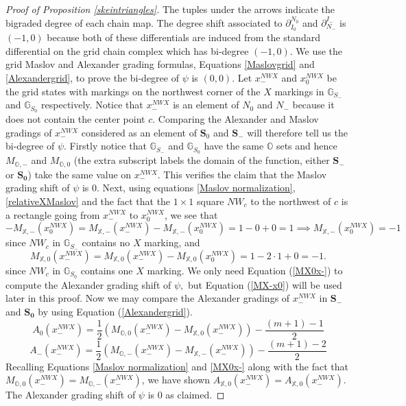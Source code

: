 \documentclass[11pt]{amsart}
\theoremstyle{definition}
\theoremstyle{remark}
\numberwithin{equation}{section}
\begin{document}
\begin{proof}[Proof of Proposition \ref{skeintriangles}]
The tuples under the arrows indicate the bigraded degree of each chain map. The degree shift associated to $\partial_{I_0}^{N_0}$ and $\partial_{N_-}^{I_-}$ is $(-1,0)$ because both of these differentials are induced from the standard differential on the grid chain complex which has bi-degree $(-1,0)$. We use the grid Maslov and Alexander grading formulas, Equations \ref{Maslovgrid} and \ref{Alexandergrid}, to prove the bi-degree of $\psi$ is $(0,0)$.  Let $x_-^{NWX}$ and $x_0^{NWX}$ be the grid states with markings on the northwest corner of the $X$ markings in $\mathbb{G}_{S_-}$ and $\mathbb{G}_{S_0}$ respectively. Notice that $x_-^{NWX}$ is an element of $N_0$ and $N_-$ because it does not contain the center point $c$. Comparing the Alexander and Maslov gradings of $x_-^{NWX}$ considered as an element of $\mathbf{S}_0$ and $\mathbf{S}_-$ will therefore tell us the bi-degree of $\psi$. Firstly notice that $\mathbb{G}_{S_-}$ and $\mathbb{G}_{S_0}$ have the same $\mathbb{O}$ sets and hence $M_{\mathbb{O},-}$ and $M_{\mathbb{O},0}$ (the extra subscript labels the domain of the function, either $\mathbf{S_-}$ or $\mathbf{S_0}$) take the same value on $x_-^{NWX}$. This verifies the claim that the Maslov grading shift of $\psi$ is $0$. Next, using equations \ref{Maslov normalization}, \ref{relativeXMaslov} and the fact that the $1\times1$ square $NW_c$ to the northwest of $c$ is a rectangle going from $x_-^{NWX}$ to $x_0^{NWX}$, we see that 
\begin{equation}\label{MX-x0}
    -M_{\mathbb{X},-}(x_0^{NWX})=M_{\mathbb{X},-}(x_-^{NWX})-M_{\mathbb{X},-}(x_0^{NWX})=1-0+0=1\implies M_{\mathbb{X},-}(x_0^{NWX})=-1
\end{equation}
since $NW_c$ in $\mathbb{G}_{S_-}$ contains no $X$ marking, and 
\begin{equation}\label{MX0x-}
M_{\mathbb{X},0}(x_-^{NWX})=M_{\mathbb{X},0}(x_-^{NWX})-M_{\mathbb{X},0}(x_0^{NWX})=1-2\cdot 1+0=-1. 
\end{equation}
since $NW_c$ in $\mathbb{G}_{S_0}$ contains one $X$ marking.
We only need Equation (\ref{MX0x-}) to compute the Alexander grading shift of $\psi,$ but Equation (\ref{MX-x0}) will be used later in this proof. Now we may compare the Alexander gradings of $x_-^{NWX}$ in $\mathbf{S_-}$ and $\mathbf{S_0}$ by using Equation (\ref{Alexandergrid}).
\begin{equation}\label{alex0x-}
     A_{0}(x_-^{NWX})=\frac{1}{2}(M_{\mathbb{O}, 0}(x_-^{NWX})-M_{\mathbb{X},0}(x_-^{NWX}))-\frac{(m+1)-1}{2}
\end{equation}
\begin{equation}\label{alex-x-}
    A_{-}(x_-^{NWX})=\frac{1}{2}(M_{\mathbb{O}, -}(x_-^{NWX})-M_{\mathbb{X},-}(x_-^{NWX}))-\frac{(m+1)-2}{2}
\end{equation}
Recalling Equations \ref{Maslov normalization} and \ref{MX0x-} along with the fact that $M_{\mathbb{O},0}(x_-^{NWX})=M_{\mathbb{O},-}(x_-^{NWX})$, we have shown  $A_{\mathbb{X},0}(x_-^{NWX})=A_{\mathbb{X},0}(x_-^{NWX})$. The Alexander grading shift of $\psi$ is 0 as claimed.



\end{proof}
\end{document}
